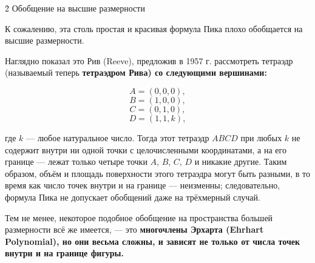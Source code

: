 \h2{ Обобщение на высшие размерности }

К сожалению, эта столь простая и красивая формула Пика плохо обобщается на высшие размерности.

Наглядно показал это Рив (Reeve), предложив в 1957 г. рассмотреть тетраэдр (называемый теперь \bf{тетраэдром Рива}) со следующими вершинами:

$$ A = (0,0,0), $$
$$ B = (1,0,0), $$
$$ C = (0,1,0), $$
$$ D = (1,1,k), $$

где $k$ --- любое натуральное число. Тогда этот тетраэдр $ABCD$ при любых $k$ не содержит внутри ни одной точки с целочисленными координатами, а на его границе --- лежат только четыре точки $A$, $B$, $C$, $D$ и никакие другие. Таким образом, объём и площадь поверхности этого тетраэдра могут быть разными, в то время как число точек внутри и на границе --- неизменны; следовательно, формула Пика не допускает обобщений даже на трёхмерный случай.

Тем не менее, некоторое подобное обобщение на пространства большей размерности всё же имеется, --- это \bf{многочлены Эрхарта} (Ehrhart Polynomial), но они весьма сложны, и зависят не только от числа точек внутри и на границе фигуры.

